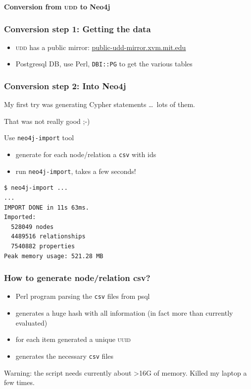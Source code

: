 \documentclass[hyperref]{beamer}
\newcommand{\acro}[1]{\textsc{\MakeLowercase{#1}}}
\newcommand{\cutin}[1]{%
\begin{frame}[c]\begin{center}{\Large\bf\color{myblue}#1}\end{center}\end{frame}}
\def\bis{\\[\bigskipamount]}
\begin{document}
\cutin{Conversion from \acro{UDD} to Neo4j}

\begin{frame}[fragile]
  \frametitle{Conversion step 1: Getting the data}
  \begin{itemize}
  \item \acro{UDD} has a public mirror:
    \url{public-udd-mirror.xvm.mit.edu}\bis
  \item Postgresql DB, use Perl, \texttt{DBI::PG} to get the various tables
  \end{itemize}
\end{frame}

\begin{frame}[fragile]
  \frametitle{Conversion step 2: Into Neo4j}
  My first try was generating Cypher statements \ldots\ lots of them.

  \pause That was not really good ;-)\pause

  \begin{block}{Use \texttt{neo4j-import} tool}
    \begin{itemize}
    \item generate for each node/relation a \texttt{csv} with ids
    \item run \texttt{neo4j-import}, takes a few seconds!
    \end{itemize}
  \end{block}
  \pause
  \begin{lstlisting}
$ neo4j-import ...
...
IMPORT DONE in 11s 63ms. 
Imported:
  528049 nodes
  4489516 relationships
  7540882 properties
Peak memory usage: 521.28 MB
\end{lstlisting}
\end{frame}


\begin{frame}
  \frametitle{How to generate node/relation csv?}
  \begin{itemize}
  \item Perl program parsing the \texttt{csv} files from psql\bis
  \item generates a huge hash with all information (in fact more than
    currently evaluated)\bis
  \item for each item generated a unique \acro{UUID}\bis
  \item generates the necessary \texttt{csv} files
  \end{itemize}

  \medskip
  \pause
  Warning: the script needs currently about >16G of memory. Killed my
  laptop a few times.
\end{frame}
\end{document}
